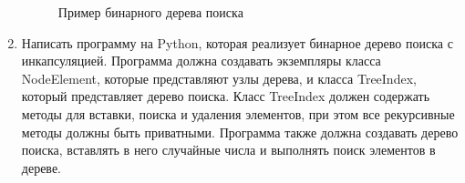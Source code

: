\begin{enumerate}
\begin{figure}[h]
\centering
{}
\caption{Пример бинарного дерева поиска}
\end{figure}

\item Написать программу на Python, которая реализует бинарное дерево поиска с инкапсуляцией. Программа должна создавать экземпляры класса NodeElement, которые представляют узлы дерева, и класса TreeIndex, который представляет дерево поиска. Класс TreeIndex должен содержать методы для вставки, поиска и удаления элементов, при этом все рекурсивные методы должны быть приватными. Программа также должна создавать дерево поиска, вставлять в него случайные числа и выполнять поиск элементов в дереве.


\end{enumerate}
